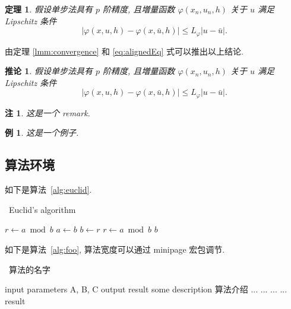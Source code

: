 \documentclass[12pt,final]{article}
\makeatletter
\numberwithin{equation}{section}
\numberwithin{figure}{section}
\numberwithin{table}{section}
\theoremstyle{plain}
\newtheorem{theorem}{定理}[section]
\newtheorem{example}{例}
\newtheorem{corollary}{推论}[section]
\newtheorem{remark}{注}[section]
\renewcommand{\proofname}{证明}
\renewenvironment{proof}[1][\proofname]{\par
  \pushQED{\qed}%
  \normalfont \topsep6\p@\@plus6\p@\relax
  \trivlist\item[\hskip\labelsep
  \bfseries #1\@addpunct{\,:\,}]\ignorespaces
}{%
  \popQED\endtrivlist\@endpefalse
}
\makeatother
\begin{document}
\begin{theorem}\label{thm:convergence}
假设单步法具有 $p$ 阶精度, 且増量函数 $\varphi(x_{n}, u_{n}, h)$ 关于 $u$ 满足\textup{Lipschitz} 条件
\begin{equation}\label{eq:conver2}
|\varphi(x, u, h)-\varphi(x, \bar{u}, h)| \leqslant L_{\varphi}|u-\bar{u}|.
\end{equation}
\end{theorem}
\begin{proof}[\normalfont\bfseries 证明~\nopunct]
由定理 \ref{lmm:convergence} 和 \eqref{eq:alignedEq} 式可以推出以上结论.
\end{proof}

\begin{corollary}\label{col:convergence}
假设单步法具有 $p$ 阶精度, 且増量函数 $\varphi(x_{n}, u_{n}, h)$ 关于 $u$ 满足 \textup{Lipschitz} 条件
\begin{equation}\label{eq:conver3}
|\varphi(x, u, h)-\varphi(x, \bar{u}, h)| \leqslant L_{\varphi}|u-\bar{u}|.
\end{equation}
\end{corollary}

\begin{remark}\label{rem:remark}
这是一个 remark.
\end{remark}

\begin{example}
这是一个例子.
\end{example}


\clearpage
\subsection{算法环境}

如下是算法~\ref{alg:euclid}.
\begin{algorithm}[H]
\small
\caption{~Euclid's algorithm}\label{alg:euclid}
\begin{algorithmic}[1]
  \State $r\gets a\bmod b$
  \State $a\gets b$
  \State $b\gets r$
  \State $r\gets a\bmod b$
  \EndWhile\label{euclidendwhile}
  \State \Return $b$
  \EndProcedure
\end{algorithmic}
\end{algorithm}

如下是算法~\ref{alg:foo}, 算法宽度可以通过 minipage 宏包调节.

\begin{center}
\vspace{-2ex}
\begin{minipage}{.9\linewidth}
\begin{algorithm}[H]
\caption{~算法的名字}\label{alg:foo}
\begin{algorithmic}[1]
\Require input parameters A, B, C
\Ensure output result
\State some description 算法介绍
  \State ...
    \State ...
    \Else
    \State ...
  \EndIf
\EndFor
{}
  \State ...
\EndWhile
\State \Return result
\end{algorithmic}
\end{algorithm}
\end{minipage}
\end{center}
\end{document}

